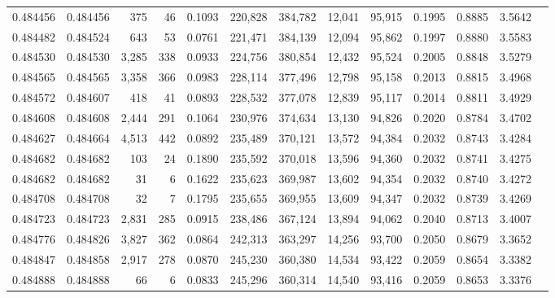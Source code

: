 \begin{tabular}{rrrrrrrrrrrrr}
0.484456 & 0.484456 &   375 &    46 &                                     0.1093 & 220,828 & 384,782 &  12,041 &  95,915 & 0.1995 & 0.8885 & 3.5642 \\
0.484482 & 0.484524 &   643 &    53 &                                     0.0761 & 221,471 & 384,139 &  12,094 &  95,862 & 0.1997 & 0.8880 & 3.5583 \\
0.484530 & 0.484530 & 3,285 &   338 &                                     0.0933 & 224,756 & 380,854 &  12,432 &  95,524 & 0.2005 & 0.8848 & 3.5279 \\
0.484565 & 0.484565 & 3,358 &   366 &                                     0.0983 & 228,114 & 377,496 &  12,798 &  95,158 & 0.2013 & 0.8815 & 3.4968 \\
0.484572 & 0.484607 &   418 &    41 &                                     0.0893 & 228,532 & 377,078 &  12,839 &  95,117 & 0.2014 & 0.8811 & 3.4929 \\
0.484608 & 0.484608 & 2,444 &   291 &                                     0.1064 & 230,976 & 374,634 &  13,130 &  94,826 & 0.2020 & 0.8784 & 3.4702 \\
0.484627 & 0.484664 & 4,513 &   442 &                                     0.0892 & 235,489 & 370,121 &  13,572 &  94,384 & 0.2032 & 0.8743 & 3.4284 \\
0.484682 & 0.484682 &   103 &    24 &                                     0.1890 & 235,592 & 370,018 &  13,596 &  94,360 & 0.2032 & 0.8741 & 3.4275 \\
0.484682 & 0.484682 &    31 &     6 &                                     0.1622 & 235,623 & 369,987 &  13,602 &  94,354 & 0.2032 & 0.8740 & 3.4272 \\
0.484708 & 0.484708 &    32 &     7 &                                     0.1795 & 235,655 & 369,955 &  13,609 &  94,347 & 0.2032 & 0.8739 & 3.4269 \\
0.484723 & 0.484723 & 2,831 &   285 &                                     0.0915 & 238,486 & 367,124 &  13,894 &  94,062 & 0.2040 & 0.8713 & 3.4007 \\
0.484776 & 0.484826 & 3,827 &   362 &                                     0.0864 & 242,313 & 363,297 &  14,256 &  93,700 & 0.2050 & 0.8679 & 3.3652 \\
0.484847 & 0.484858 & 2,917 &   278 &                                     0.0870 & 245,230 & 360,380 &  14,534 &  93,422 & 0.2059 & 0.8654 & 3.3382 \\
0.484888 & 0.484888 &    66 &     6 &                                     0.0833 & 245,296 & 360,314 &  14,540 &  93,416 & 0.2059 & 0.8653 & 3.3376 \\

\end{tabular}
